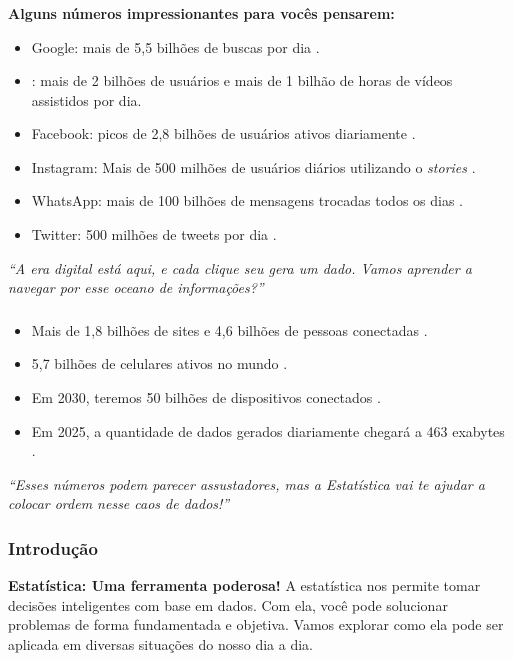 \documentclass[12pt]{beamer}
\begin{document}
\begin{frame}{}
	\frametitle{}
	\begin{block}{}
		\justifying
		\textbf{Alguns números impressionantes para vocês pensarem:}
		\begin{itemize}
			\item Google: mais de 5,5 bilhões de buscas por dia \cite{ardorseo}.\pause
			\item \citet{youtube}: mais de 2 bilhões de usuários e mais de 1 bilhão de horas de vídeos assistidos por dia.\pause
			\item Facebook: picos de 2,8 bilhões de usuários ativos diariamente \cite{internetstats}.\pause
			\item Instagram: Mais de 500 milhões de usuários diários utilizando o \textit{stories} \cite{InstagramStats}.\pause
			\item WhatsApp: mais de 100 bilhões de mensagens trocadas todos os dias \cite{WhatsappStats}.\pause
			\item Twitter: 500 milhões de tweets por dia \cite{TwitterStats}.
		\end{itemize}
		\textit{``A era digital está aqui, e cada clique seu gera um dado. Vamos aprender a navegar por esse oceano de informações?''}
	\end{block}
\end{frame}

\begin{frame}{}
	\frametitle{}
	\begin{block}{}
		\justifying
		\begin{itemize}
			\item Mais de 1,8 bilhões de sites e 4,6 bilhões de pessoas conectadas \cite{internetstats2}.\pause
			\item 5,7 bilhões de celulares ativos no mundo \cite{datareportal}.\pause
			\item Em 2030, teremos 50 bilhões de dispositivos conectados \cite{statista}.\pause
			\item Em 2025, a quantidade de dados gerados diariamente chegará a 463 exabytes \cite{seedscientific}.
		\end{itemize}
		\textit{``Esses números podem parecer assustadores, mas a Estatística vai te ajudar a colocar ordem nesse caos de dados!''}
	\end{block}
\end{frame}


\begin{frame}{}
	\frametitle{Introdução}
	\begin{block}{}
		\justifying
		\textbf{Estatística: Uma ferramenta poderosa!} A estatística nos permite tomar decisões inteligentes com base em dados. Com ela, você pode solucionar problemas de forma fundamentada e objetiva. Vamos explorar como ela pode ser aplicada em diversas situações do nosso dia a dia.
	\end{block}
\end{frame}
\end{document}
